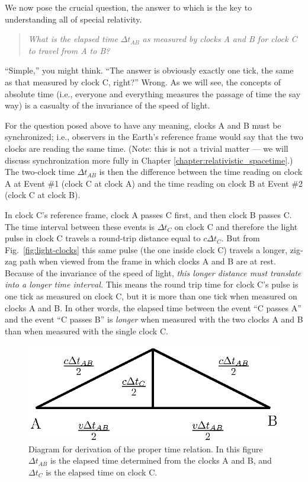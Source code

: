 We now pose the crucial question, the answer to which is the key to
understanding all of special relativity.
\begin{quote}
{\em What is the elapsed time} $\Delta t_{AB}$ {\em as measured by
clocks A and B for clock C to travel from A to B?}
\end{quote}
``Simple,'' you might think.  ``The answer is obviously exactly one
tick, the same as that measured by clock C, right?''  Wrong.  As we
will see, the concepts of absolute time (i.e., everyone and everything
measures the passage of time the say way) is a casualty of the
invariance of the speed of light.
   
For the question posed above to have any meaning, clocks A and B must
be synchronized; i.e., observers in the Earth's reference frame would
say that the two clocks are reading the same time.  (Note: this is not
a trivial matter --- we will discuss synchronization more fully in
Chapter \ref{chapter:relativistic_spacetime}.)  The two-clock time
$\Delta t_{AB}$ is then the difference between the time reading on
clock A at Event \#1 (clock C at clock A) and the time reading on
clock B at Event \#2 (clock C at clock B).
   
In clock C's reference frame, clock A passes C first, and then clock B
passes C.  The time interval between these events is $\Delta t_C$ on
clock C and therefore the light pulse in clock C travels a round-trip
distance equal to $c\Delta t_C$.  But from Fig.~\ref{fig:light-clocks}
this same pulse (the one inside clock C) travels a longer, zig-zag
path when viewed from the frame in which clocks A and B are at rest.
Because of the invariance of the speed of light, {\em this longer
  distance must translate into a longer time interval.}  This means
the round trip time for clock C's pulse is one tick as measured on
clock C, but it is more than one tick when measured on clocks A and B.
In other words, the elapsed time between the event ``C passes A'' and
the event ``C passes B'' is {\em longer} when measured with the two
clocks A and B than when measured with the single clock C.

\begin{figure}[tbp]
  \begin{center}
    \includegraphics{basic_postulates_of_relativity/rel1_triangle.eps}
  \end{center}
  \caption{Diagram for derivation of the proper time relation.  In 
    this figure $\Delta t_{AB}$ is the elapsed time determined from 
    the clocks A and B, and $\Delta t_C$ is the elapsed time on clock C.}
  \label{fig:rel_triangle}
\end{figure}

